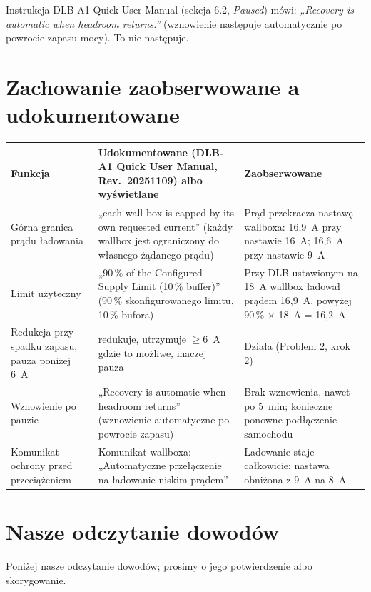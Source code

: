 \documentclass[11pt,a4paper]{article}
\begin{document}
Instrukcja DLB-A1 Quick User Manual (sekcja 6.2, \emph{Paused}) mówi: \emph{„Recovery is automatic when headroom returns.”} (wznowienie następuje automatycznie po powrocie zapasu mocy). To nie następuje.

\section{Zachowanie zaobserwowane a udokumentowane}

\begin{longtable}{>{\raggedright\arraybackslash}p{5.0cm}>{\raggedright\arraybackslash}p{5.1cm}>{\raggedright\arraybackslash}p{5.8cm}}
\toprule
\rowcolor{aphead}\textbf{Funkcja} & \textbf{Udokumentowane (DLB-A1 Quick User Manual, Rev.~20251109) albo wyświetlane} & \textbf{Zaobserwowane} \\
\midrule\endhead
\bottomrule\endfoot
Górna granica prądu ładowania & „each wall box is capped by its own requested current” (każdy wallbox jest ograniczony do własnego żądanego prądu) & Prąd przekracza nastawę wallboxa: 16,9~A przy nastawie 16~A; 16,6~A przy nastawie 9~A \\
Limit użyteczny & „90\,\% of the Configured Supply Limit (10\,\% buffer)” (90\,\% skonfigurowanego limitu, 10\,\% bufora) & Przy DLB ustawionym na 18~A wallbox ładował prądem 16,9~A, powyżej 90\,\% $\times$ 18~A = 16,2~A \\
Redukcja przy spadku zapasu, pauza poniżej 6~A & redukuje, utrzymuje $\geq$6~A gdzie to możliwe, inaczej pauza & Działa (Problem 2, krok 2) \\
Wznowienie po pauzie & „Recovery is automatic when headroom returns” (wznowienie automatyczne po powrocie zapasu) & Brak wznowienia, nawet po 5~min; konieczne ponowne podłączenie samochodu \\
Komunikat ochrony przed przeciążeniem & Komunikat wallboxa: „Automatyczne przełączenie na ładowanie niskim prądem” & Ładowanie staje całkowicie; nastawa obniżona z 9~A na 8~A \\
\end{longtable}

\section{Nasze odczytanie dowodów}

Poniżej nasze odczytanie dowodów; prosimy o jego potwierdzenie albo skorygowanie.
\end{document}
